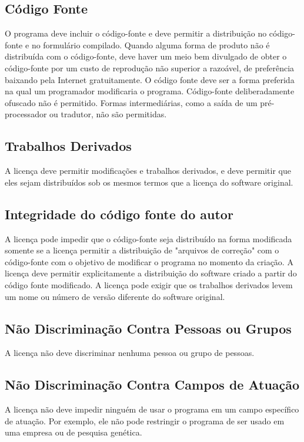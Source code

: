 \subsection{Código Fonte}
O programa deve incluir o código-fonte e deve permitir a distribuição no código-fonte e no formulário compilado. Quando alguma forma de produto não é distribuída com o código-fonte, deve haver um meio bem divulgado de obter o código-fonte por um custo de reprodução não superior a razoável, de preferência baixando pela Internet gratuitamente. O código fonte deve ser a forma preferida na qual um programador modificaria o programa. Código-fonte deliberadamente ofuscado não é permitido. Formas intermediárias, como a saída de um pré-processador ou tradutor, não são permitidas.

\subsection{Trabalhos Derivados}
A licença deve permitir modificações e trabalhos derivados, e deve permitir que eles sejam distribuídos sob os mesmos termos que a licença do software original.

\subsection{Integridade do código fonte do autor}
A licença pode impedir que o código-fonte seja distribuído na forma modificada somente se a licença permitir a distribuição de "arquivos de correção" com o código-fonte com o objetivo de modificar o programa no momento da criação. A licença deve permitir explicitamente a distribuição do software criado a partir do código fonte modificado. A licença pode exigir que os trabalhos derivados levem um nome ou número de versão diferente do software original.

\subsection{Não Discriminação Contra Pessoas ou Grupos}
A licença não deve discriminar nenhuma pessoa ou grupo de pessoas.

\subsection{Não Discriminação Contra Campos de Atuação}
A licença não deve impedir ninguém de usar o programa em um campo específico de atuação. Por exemplo, ele não pode restringir o programa de ser usado em uma empresa ou de pesquisa genética.

